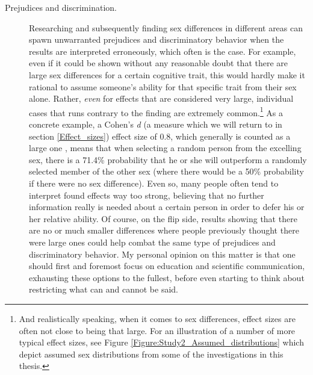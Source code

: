 \begin{description} \item [Prejudices and discrimination.] Researching and subsequently finding sex differences in different areas can spawn unwarranted prejudices and discriminatory behavior when the results are interpreted erroneously, which often is the case. For example, even if it could be shown without any reasonable doubt that there are large sex differences for a certain cognitive trait, this would hardly make it rational to assume someone's ability for that specific trait from their sex alone. Rather, \emph{even} for effects that are considered very large, individual cases that runs contrary to the finding are extremely common.\footnote{And realistically speaking, when it comes to sex differences, effect sizes are often not close to being that large. For an illustration of a number of more typical effect sizes, see Figure \ref{Figure:Study2_Assumed_distributions} which depict assumed sex distributions from some of the investigations in this thesis.} As a concrete example, a Cohen's \emph{d} (a measure which we will return to in section \ref{Effect_sizes}) effect size of 0.8, which generally is counted as a large one \parencite[pp. 24-27]{Cohen1988}, means that when selecting a random person from the excelling sex, there is a 71.4\% probability that he or she will outperform a randomly selected member of the other sex (where there would be a 50\% probability if there were no sex difference). Even so, many people often tend to interpret found effects way too strong, believing that no further information really is needed about a certain person in order to defer his or her relative ability. Of course, on the flip side, results showing that there are no or much smaller differences where people previously thought there were large ones could help combat the same type of prejudices and discriminatory behavior. My personal opinion on this matter is that one should first and foremost focus on education and scientific communication, exhausting these options to the fullest, before even starting to think about restricting what can and cannot be said.


\end{description}
